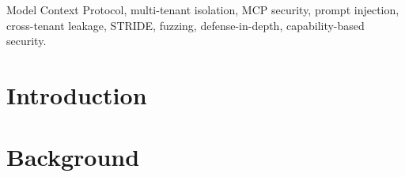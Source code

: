 \documentclass[10pt,letterpaper,twocolumn]{article}
\title{\project}
\author{%
  MCP Isolation Research Authors\\
  \texttt{\{authors\}@mcp-iso.research}%
}
\date{July 2026}
\begin{document}
\maketitle

\begin{abstract}
\noindent
The \mcp{} distributes isolation across eight implicit trust
boundaries without mandating enforcement at any of them. As
multi-tenant deployments emerge, cross-tenant leakage becomes a
first-class concern: we present the first systematic study of
\emph{cross-tenant} MCP isolation, complementing Chen et al.'s
single-tenant runtime study. We catalogue all eight boundaries
with STRIDE attack-surface rows (63 ticket IDs, four misuse
cases), ship an open attack library of 50 concrete classes
(48 per-boundary plus prompt injection and grammar fuzzing), and
introduce a reproducible framework that measures cross-tenant
leakage under controlled concurrency. Across four research
questions and 30 iterations per cell, cache attacks dominate the
vulnerable server's leakage volume (85.7\%, $z = 40.73$,
$p < 10^{-4}$); the composition of four protocol-layer defenses
(per-tenant tool registry, tenant-prefixed cache keys,
resource-path canonicalisation, audience-bound JWTs) reduces
leak rate to zero (sign test $p = 0.031$, Wilcoxon
$p = 0.031$); no single defense closes the gap alone. We close
with a layered defense blueprint and three concrete
spec-change recommendations for MCP-2. \emph{All experiments use
synthetic tenant data; no real user data, credentials, or LLM
outputs are involved. The vulnerable reference server runs
inside a Firecracker microVM.}
\end{abstract}

\begin{keywords}
Model Context Protocol, multi-tenant isolation, MCP security,
prompt injection, cross-tenant leakage, STRIDE, fuzzing,
defense-in-depth, capability-based security.
\end{keywords}

\section{Introduction}


\section{Background}

\end{document}
